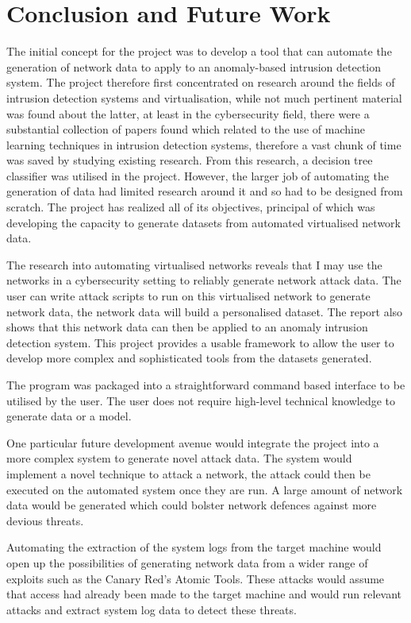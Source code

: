 \chapter{Conclusion and Future Work}
The initial concept for the project was to develop a tool that can automate the generation of network data to apply to an anomaly-based intrusion detection system. The project therefore first concentrated on research around the fields of intrusion detection systems and virtualisation, while not much pertinent material was found about the latter, at least in the cybersecurity field, there were a substantial collection of papers found which related to the use of machine learning techniques in intrusion detection systems, therefore a vast chunk of time was saved by studying existing research. From this research, a decision tree classifier was utilised in the project. However, the larger job of automating the generation of data had limited research around it and so had to be designed from scratch. The project has realized all of its objectives, principal of which was developing the capacity to generate datasets from automated virtualised network data. 

The research into automating virtualised networks reveals that I may use the networks in a cybersecurity setting to reliably generate network attack data. The user can write attack scripts to run on this virtualised network to generate network data, the network data will build a personalised dataset. The report also shows that this network data can then be applied to an anomaly intrusion detection system. This project provides a usable framework to allow the user to develop more complex and sophisticated tools from the datasets generated.

The program was packaged into a straightforward command based interface to be utilised by the user. The user does not require high-level technical knowledge to generate data or a model.

One particular future development avenue would integrate the project into a more complex system to generate novel attack data. The system would implement a novel technique to attack a network, the attack could then be executed on the automated system once they are run. A large amount of network data would be generated which could bolster network defences against more devious threats.

Automating the extraction of the system logs from the target machine would open up the possibilities of generating network data from a wider range of exploits such as the Canary Red’s Atomic Tools. These attacks would assume that access had already been made to the target machine and would run relevant attacks and extract system log data to detect these threats.

